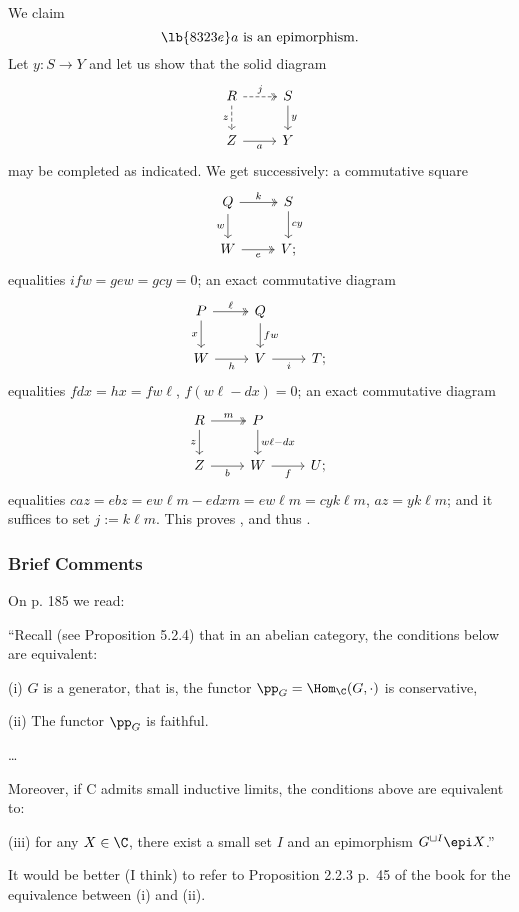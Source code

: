 \documentclass[12pt]{article}
\theoremstyle{remark}
\theoremstyle{definition}
\begin{document}
We claim
\begin{equation}\lb{8323e}
a\text{ is an epimorphism}.
\end{equation} 
Let $y:S\to Y$ and let us show that the solid diagram 
$$
\begin{tikzcd}
R\ar[d,"z"',dashed]\ar[r,"j",dashed,two heads]&S\ar[d,"y"]\\ 
Z\ar[r,"a"']&Y
\end{tikzcd}
$$ 
may be completed as indicated. We get successively: a commutative square 
$$
\begin{tikzcd}
Q\ar[d,"w"']\ar[r,"k",two heads]&S\ar[d,"cy"]\\ 
W\ar[r,"e"',two heads]&V;
\end{tikzcd}
$$ 
equalities $ifw=gew=gcy=0$; an exact commutative diagram 
$$
\begin{tikzcd}
P\ar[d,"x"']\ar[r,"\ell",two heads]&Q\ar[d,"fw"]\\ 
W\ar[r,"h"']&V\ar[r,"i"']&T;
\end{tikzcd}
$$ 
equalities $fdx=hx=fw\ell$, $f(w\ell-dx)=0$; an exact commutative diagram 
$$
\begin{tikzcd}
R\ar[d,"z"']\ar[r,"m",two heads]&P\ar[d,"w\ell-dx"]\\ 
Z\ar[r,"b"']&W\ar[r,"f"']&U;
\end{tikzcd}
$$ 
equalities $caz=ebz=ew\ell m-edxm=ew\ell m=cyk\ell m$, $az=yk\ell m$; and it suffices to set $j:=k\ell m$. This proves , and thus .


\subsubsection{Brief Comments}

\begin{s} 
On p. 185 we read:

``Recall (see Proposition 5.2.4) that in an abelian category, the conditions
below are equivalent:

(i) $G$ is a generator, that is, the functor $\pp_G=\Hom_\C(G,\cdot)$ is conservative,

(ii) The functor $\pp_G$ is faithful.

\nn\dots

Moreover, if C admits small inductive limits, the conditions above are
equivalent to:

(iii) for any $X\in\C$, there exist a small set $I$ and an epimorphism $G^{\sqcup I}\epi X$.''

It would be better (I think) to refer to Proposition 2.2.3 p.~45 of the book for the equivalence between (i) and (ii).
\end{s}
\end{document}
